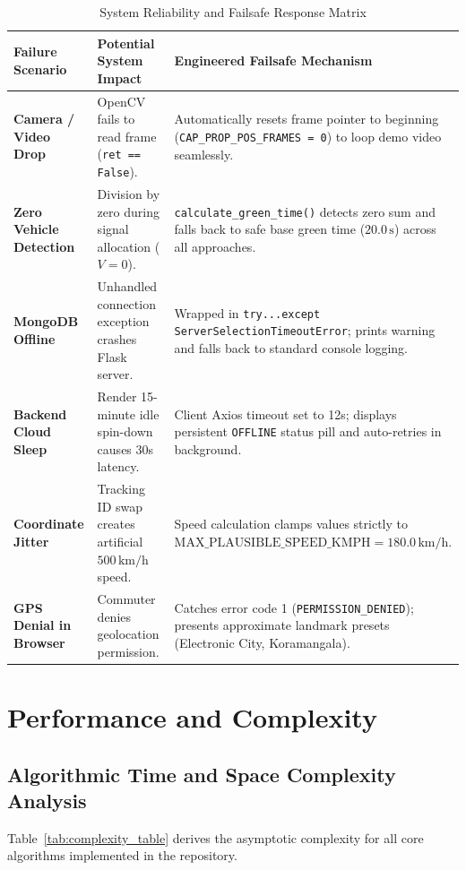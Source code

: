 \documentclass[11pt,a4paper,oneside]{report}
\begin{document}
\begin{table}[h!]
\centering
\small
\begin{tabularx}{\textwidth}{p{3.8cm} p{4.2cm} X}
\toprule
\textbf{Failure Scenario} & \textbf{Potential System Impact} & \textbf{Engineered Failsafe Mechanism} \\
\midrule
\textbf{Camera / Video Drop} & OpenCV fails to read frame (\texttt{ret == False}). & Automatically resets frame pointer to beginning (\texttt{CAP\_PROP\_POS\_FRAMES = 0}) to loop demo video seamlessly. \\
\textbf{Zero Vehicle Detection} & Division by zero during signal allocation ($V = 0$). & \texttt{calculate\_green\_time()} detects zero sum and falls back to safe base green time ($20.0\,\text{s}$) across all approaches. \\
\textbf{MongoDB Offline} & Unhandled connection exception crashes Flask server. & Wrapped in \texttt{try...except ServerSelectionTimeoutError}; prints warning and falls back to standard console logging. \\
\textbf{Backend Cloud Sleep} & Render 15-minute idle spin-down causes 30s latency. & Client Axios timeout set to 12s; displays persistent \texttt{OFFLINE} status pill and auto-retries in background. \\
\textbf{Coordinate Jitter} & Tracking ID swap creates artificial $500\,\text{km/h}$ speed. & Speed calculation clamps values strictly to $\text{MAX\_PLAUSIBLE\_SPEED\_KMPH} = 180.0\,\text{km/h}$. \\
\textbf{GPS Denial in Browser} & Commuter denies geolocation permission. & Catches error code 1 (\texttt{PERMISSION\_DENIED}); presents approximate landmark presets (Electronic City, Koramangala). \\
\bottomrule
\end{tabularx}
\caption{System Reliability and Failsafe Response Matrix}
\label{tab:failsafe_matrix}
\end{table}



\chapter{Performance and Complexity}

\section{Algorithmic Time and Space Complexity Analysis}
Table~\ref{tab:complexity_table} derives the asymptotic complexity for all core algorithms implemented in the repository.
\end{document}
